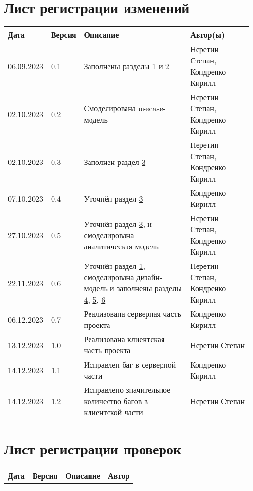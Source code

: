 \chapter*{Лист регистрации изменений}
	\begin{tabularx}{\textwidth}{
			| >{\centering\arraybackslash\hsize=2.5cm}X
			| >{\centering\arraybackslash\hsize=1.5cm}X
			| >{\centering\arraybackslash}X
			| >{\centering\arraybackslash\hsize=5cm}X
			|}
		\hline
		\textbf{Дата} & \textbf{Версия} & \textbf{Описание} & \textbf{Автор(ы)} \\\hline
		
		06.09.2023 & 0.1 & Заполнены разделы \hyperref[chapter1]{1} и \hyperref[chapter2]{2} & Неретин Степан, Кондренко Кирилл \\\hline
				
		02.10.2023 & 0.2 & Смоделирована usecase-модель & Неретин Степан, Кондренко Кирилл \\\hline
		
		02.10.2023 & 0.3 & Заполнен раздел \hyperref[chapter3]{3} & Неретин Степан, Кондренко Кирилл \\\hline
		
		07.10.2023 & 0.4 & Уточнён раздел \hyperref[chapter3]{3} & Кондренко Кирилл \\\hline

		27.10.2023 & 0.5 & Уточнён раздел \hyperref[chapter3]{3}, и смоделирована аналитическая модель & Неретин Степан, Кондренко Кирилл \\\hline
		
		22.11.2023 & 0.6 & Уточнён раздел \hyperref[chapter1]{1}, смоделирована дизайн-модель и заполнены разделы \hyperref[chapter4]{4}, \hyperref[chapter5]{5}, \hyperref[chapter6]{6} & Неретин Степан, Кондренко Кирилл \\\hline
		
		06.12.2023 & 0.7 & Реализована серверная часть проекта & Кондренко Кирилл \\\hline
		
		13.12.2023 & 1.0 & Реализована клиентская часть проекта & Неретин Степан \\\hline
		
		14.12.2023 & 1.1 & Исправлен баг в серверной части & Кондренко Кирилл \\\hline
		
		14.12.2023 & 1.2 & Исправлено значительное количество багов в клиентской части & Неретин Степан \\\hline
	\end{tabularx}
\chapter*{Лист регистрации проверок}
	\begin{tabularx}{\textwidth}{
			| >{\centering\arraybackslash\hsize=2cm}X
			| >{\centering\arraybackslash\hsize=1.5cm}X
			| >{\centering\arraybackslash}X
			| >{\centering\arraybackslash\hsize=5cm}X
			|}
		\hline
		\textbf{Дата} & \textbf{Версия} & \textbf{Описание} & \textbf{Автор} \\\hline
		&&& \\\hline
	\end{tabularx}
